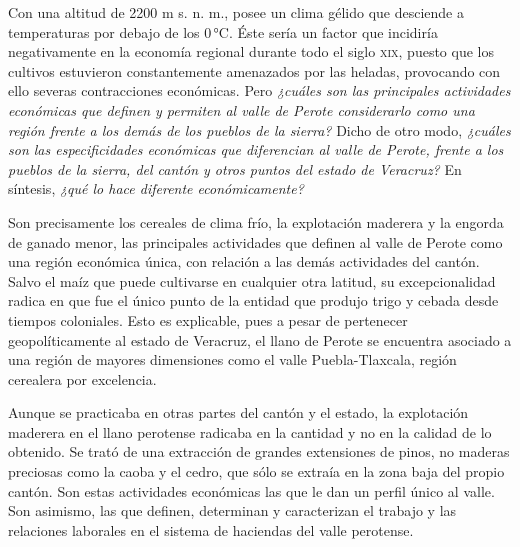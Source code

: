 \documentclass[14pt,twoside,final]{extbook} %
\begin{document}
Con una altitud de 2200 m s. n. m., posee un clima gélido que desciende a temperaturas por debajo de los 0\,°C. Éste sería un factor que incidiría negativamente en la economía regional durante todo el siglo \textsc{xix}, puesto que los cultivos estuvieron constantemente amenazados por las heladas, provocando con ello severas contracciones económicas. Pero \emph{¿cuáles son las principales actividades económicas que definen y permiten al valle de Perote considerarlo como una región frente a los demás de los pueblos de la sierra?} Dicho de otro modo, \emph{¿cuáles son las especificidades económicas que diferencian al valle de Perote, frente a los pueblos de la sierra, del cantón y otros puntos del estado de Veracruz?} En síntesis, \emph{¿qué lo hace diferente económicamente?}

Son precisamente los cereales de clima frío, la explotación maderera y la engorda de ganado menor, las principales actividades que definen al valle de Perote como una región económica única, con relación a las demás actividades del cantón. Salvo el maíz que puede cultivarse en cualquier otra latitud, su excepcionalidad radica en que fue el único punto de la entidad que produjo trigo y cebada desde tiempos coloniales. Esto es explicable, pues a pesar de pertenecer geopolíticamente al estado de Veracruz, el llano de Perote se encuentra asociado a una región de mayores dimensiones como el valle Puebla-Tlaxcala, región cerealera por excelencia.

Aunque se practicaba en otras partes del cantón y el estado, la explotación maderera en el llano perotense radicaba en la cantidad y no en la calidad de lo obtenido. Se trató de una extracción de grandes extensiones de pinos, no maderas preciosas como la caoba y el cedro, que sólo se extraía en la zona baja del propio cantón. Son estas actividades económicas las que le dan un perfil único al valle. Son asimismo, las que definen, determinan y caracterizan el trabajo y las relaciones laborales en el sistema de haciendas del valle perotense.
\end{document}
